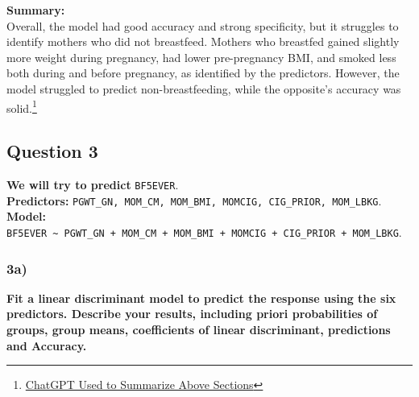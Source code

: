 \documentclass[
]{article}
\newenvironment{Shaded}{\begin{snugshade}}{\end{snugshade}}
\newcommand{\AttributeTok}[1]{\textcolor[rgb]{0.13,0.29,0.53}{#1}}
\newcommand{\CommentTok}[1]{\textcolor[rgb]{0.56,0.35,0.01}{\textit{#1}}}
\newcommand{\ConstantTok}[1]{\textcolor[rgb]{0.56,0.35,0.01}{#1}}
\newcommand{\DecValTok}[1]{\textcolor[rgb]{0.00,0.00,0.81}{#1}}
\newcommand{\FloatTok}[1]{\textcolor[rgb]{0.00,0.00,0.81}{#1}}
\newcommand{\FunctionTok}[1]{\textcolor[rgb]{0.13,0.29,0.53}{\textbf{#1}}}
\newcommand{\NormalTok}[1]{#1}
\newcommand{\OtherTok}[1]{\textcolor[rgb]{0.56,0.35,0.01}{#1}}
\newcommand{\SpecialCharTok}[1]{\textcolor[rgb]{0.81,0.36,0.00}{\textbf{#1}}}
\begin{document}
\textbf{Summary:}\\
Overall, the model had good accuracy and strong specificity, but it
struggles to identify mothers who did not breastfeed. Mothers who
breastfed gained slightly more weight during pregnancy, had lower
pre-pregnancy BMI, and smoked less both during and before pregnancy, as
identified by the predictors. However, the model struggled to predict
non-breastfeeding, while the opposite's accuracy was solid.\footnote{\href{https://chatgpt.com/share/6713cf60-5454-8011-a41b-aa7034cdfce7}{ChatGPT
  Used to Summarize Above Sections}}

\newpage

\subsection{Question 3}\label{question-3}

\textbf{We will try to predict} \texttt{BF5EVER}.\\
\textbf{Predictors:}
\texttt{PGWT\_GN,\ MOM\_CM,\ MOM\_BMI,\ MOMCIG,\ CIG\_PRIOR,\ MOM\_LBKG}.\\
\textbf{Model:}
\texttt{BF5EVER\ \textasciitilde{}\ PGWT\_GN\ +\ MOM\_CM\ +\ MOM\_BMI\ +\ MOMCIG\ +\ CIG\_PRIOR\ +\ MOM\_LBKG}.\\

\subsubsection{3a)}\label{a-1}

\textbf{Fit a linear discriminant model to predict the response using
the six predictors. Describe your results, including priori
probabilities of groups, group means, coefficients of linear
discriminant, predictions and Accuracy.}

\begin{Shaded}
\end{Shaded}
\end{document}
